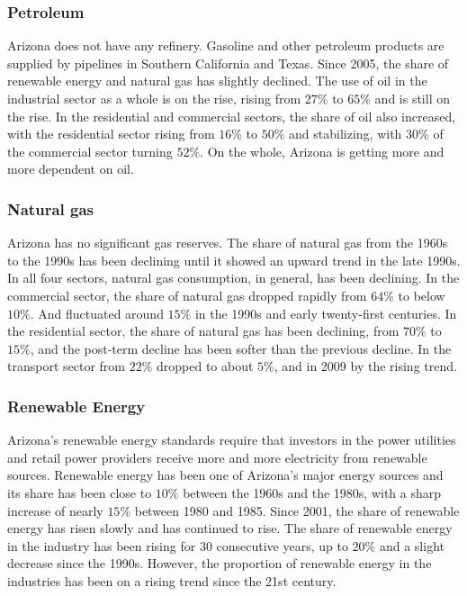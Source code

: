 \documentclass{mcmthesis}
\begin{document}
\subsubsection{Petroleum}
  Arizona does not have any refinery. Gasoline and other petroleum products are supplied by pipelines in Southern California and Texas.
  Since 2005, the share of renewable energy and natural gas has slightly declined. The use of oil in the industrial sector
  as a whole is on the rise, rising from $27\%$ to $65\%$ and is still on the rise. In the residential and commercial sectors, the share of
  oil also increased, with the residential sector rising from $16\%$ to $50\%$ and stabilizing, with $30\%$ of the commercial sector turning $52\%$.
  On the whole, Arizona is getting more and more dependent on oil.
\subsubsection{Natural gas}
  Arizona has no significant gas reserves. The share of natural gas from the 1960s to the 1990s has been declining until it showed an upward
  trend in the late 1990s. In all four sectors, natural gas consumption, in general, has been declining. In the commercial sector, the
  share of natural gas dropped rapidly from $64\%$ to below $10\%$.
  And fluctuated around $15\%$ in the 1990s and early twenty-first centuries. In the residential sector, the share of natural gas has been declining,
  from $70\%$ to $15\%$, and the post-term decline has been softer than the previous decline. In the transport sector from
  $22\%$ dropped to about $5\%$, and in 2009 by the rising trend.
\subsubsection{Renewable Energy}
  Arizona's renewable energy standards require that investors in the power utilities and retail power providers receive more and more electricity
  from renewable sources. Renewable energy has been one of Arizona's major energy sources and its share has been close to $10\%$ between the 1960s
  and the 1980s, with a sharp increase of nearly $15\%$ between 1980 and 1985. Since 2001, the share of renewable energy has risen
  slowly and has continued to rise. The share of renewable energy in the industry has been rising for 30 consecutive years, up to $20\%$ and
  a slight decrease since the 1990s. However, the proportion of renewable energy in the industries has been on a rising trend since the 21st century.
\end{document}
